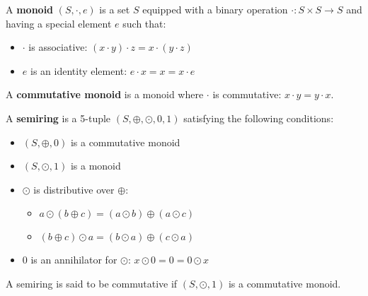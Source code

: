 
\begin{definition} 
    A \textbf{monoid} $(S, \cdot, e)$ is a set $S$ equipped with a binary operation $\cdot : S \times S \rightarrow S$ and having a special element $e$ such that:
    \begin{itemize}
        \item {$\cdot$ is associative:} $ (x \cdot y) \cdot z = x \cdot (y \cdot z)$
        \item {$e$ is an identity element:} $  e \cdot x = x = x \cdot e$
    \end{itemize}
    A \textbf{commutative monoid} is a monoid where $\cdot$ is commutative: $x \cdot y = y \cdot x$.
\end{definition}

\begin{definition} 
    \label{def_semiring}
        A \textbf{semiring} is a 5-tuple $(S,\oplus,\odot,0,1)$ satisfying the following conditions:
         \begin{itemize}
            \item {$(S,\oplus,0)$ is a commutative monoid} 
            \item {$(S,\odot,1)$ is a monoid} 
            \item {$\odot$ is distributive over $\oplus$:}
            \begin{itemize}
                \item $a \odot ( b \oplus c) = (a \odot b) \oplus (a \odot c)$ 
                \item $(b \oplus c) \odot a = (b \odot a) \oplus (c \odot a)$
            \end{itemize} 
            \item {0 is an annihilator for $\odot$:} $x \odot 0= 0 =  0 \odot x $
        \end{itemize}
        A semiring is said to be commutative if $(S,\odot,1)$ is a commutative monoid.
\end{definition}

